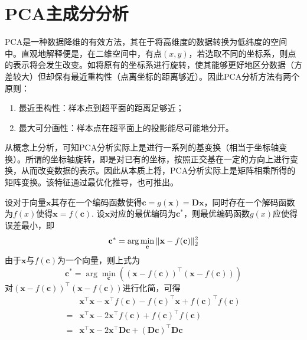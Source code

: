 \documentclass[12pt,a4paper]{article}
\begin{document}
  \section{PCA主成分分析}

  PCA是一种数据降维的有效方法，其在于将高维度的数据转换为低纬度的空间中。直观地解释便是，在二维空间中，有点$(x,y)$，若选取不同的坐标系，则点的表示将会发生改变。如将原有的坐标系进行旋转，使其能够更好地区分数据（方差较大）但却保有最近重构性（点离坐标的距离够近）。因此PCA分析方法有两个原则：
  \begin{enumerate}
    \item 最近重构性：样本点到超平面的距离足够近；
    \item 最大可分画性：样本点在超平面上的投影能尽可能地分开。
  \end{enumerate}

  从概念上分析，可知PCA分析实际上是进行一系列的基变换（相当于坐标轴变换）。所谓的坐标轴旋转，即是对已有的坐标，按照正交基在一定的方向上进行变换，从而改变数据的表示。因此从本质上将，PCA分析实际上是矩阵相乘所得的矩阵变换。该特征通过最优化推导，也可推出。

  设对于向量$\mathbf{x}$其存在一个编码函数使得$\mathbf{c}=g(\mathbf{x})=\mathbf{Dx}$，同时存在一个解码函数为$f(x)$使得$\mathbf{x}=f(\textbf{c})$. 设$\mathbf{x}$对应的最优编码为$\mathbf{c}^*$，则最优编码函数$g(x)$应使得误差最小，即
  $$
  \mathbf{c}^* = \arg\min\limits_{\mathbf{c}} \Arrowvert \mathbf{x}-f(\mathbf{c}) \Arrowvert _2^2
  $$
  由于$\mathbf{x}$与$f(\mathbf{c})$为一个向量，则上式为
  $$
  \mathbf{c}^* = \arg\min\limits_{\mathbf{c}} \left((\mathbf{x}-f(\mathbf{c}))^\top(\mathbf{x}-f(\mathbf{c}))\right)
  $$
  对$(\mathbf{x}-f(\mathbf{c}))^\top(\mathbf{x}-f(\mathbf{c}))$进行化简，可得
  $$
  \begin{aligned}
    &\mathbf{x}^\top \mathbf{x} - \mathbf{x}^\top f(\mathbf{c}) - f(\mathbf{c})^\top \mathbf{x} + f(\mathbf{c})^\top f(\mathbf{c}) \\ 
    =& \mathbf{x}^\top \mathbf{x} - 2\mathbf{x}^\top f(\mathbf{c}) + f(\mathbf{c})^\top f(\mathbf{c})\\
    =& \mathbf{x}^\top \mathbf{x} -2\mathbf{x}^\top \mathbf{Dc}+(\mathbf{Dc})^\top \mathbf{Dc}
  \end{aligned}
  $$
\end{document}
